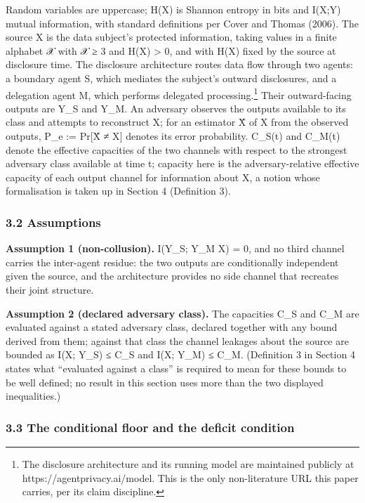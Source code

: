 \documentclass[
]{llncs}
\begin{document}
Random variables are uppercase; H(X) is Shannon entropy in bits and
I(X;Y) mutual information, with standard definitions per Cover and
Thomas (2006). The source X is the data subject's protected information,
taking values in a finite alphabet 𝒳 with \textbar 𝒳\textbar{} ≥ 3 and
H(X) \textgreater{} 0, and with H(X) fixed by the source at disclosure
time. The disclosure architecture routes data flow through two agents: a
boundary agent S, which mediates the subject's outward disclosures, and
a delegation agent M, which performs delegated processing.\footnote{The
  disclosure architecture and its running model are maintained publicly
  at https://agentprivacy.ai/model. This is the only non-literature URL
  this paper carries, per its claim discipline.} Their outward-facing
outputs are Y\_S and Y\_M. An adversary observes the outputs available
to its class and attempts to reconstruct X; for an estimator X̂ of X from
the observed outputs, P\_e := Pr{[}X̂ ≠ X{]} denotes its error
probability. C\_S(t) and C\_M(t) denote the effective capacities of the
two channels with respect to the strongest adversary class available at
time t; capacity here is the adversary-relative effective capacity of
each output channel for information about X, a notion whose
formalisation is taken up in Section 4 (Definition 3).

\subsubsection{3.2 Assumptions}\label{assumptions}

\textbf{Assumption 1 (non-collusion).} I(Y\_S; Y\_M \textbar{} X) = 0,
and no third channel carries the inter-agent residue: the two outputs
are conditionally independent given the source, and the architecture
provides no side channel that recreates their joint structure.

\textbf{Assumption 2 (declared adversary class).} The capacities C\_S
and C\_M are evaluated against a stated adversary class, declared
together with any bound derived from them; against that class the
channel leakages about the source are bounded as I(X; Y\_S) ≤ C\_S and
I(X; Y\_M) ≤ C\_M. (Definition 3 in Section 4 states what ``evaluated
against a class'' is required to mean for these bounds to be well
defined; no result in this section uses more than the two displayed
inequalities.)

\subsubsection{3.3 The conditional floor and the deficit
condition}\label{the-conditional-floor-and-the-deficit-condition}
\end{document}
